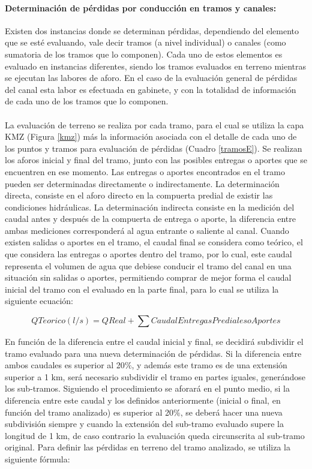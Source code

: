 \documentclass[]{article}
\begin{document}
\paragraph{Determinación de pérdidas por conducción en tramos y canales:} Existen dos instancias donde se determinan pérdidas, dependiendo del elemento que se esté evaluando, vale decir tramos (a nivel individual) o canales (como sumatoria de los tramos que lo componen). Cada uno de estos elementos es evaluado en instancias diferentes, siendo los tramos evaluados en terreno mientras se ejecutan las labores de aforo. En el caso de la evaluación general de pérdidas del canal esta labor es efectuada en gabinete, y con la totalidad de información de cada uno de los tramos que lo componen.\\
\\
La evaluación de terreno se realiza por cada tramo, para el cual se utiliza la capa KMZ (Figura \ref{kmz}) más la información asociada con el detalle de cada uno de los puntos y tramos para evaluación de pérdidas (Cuadro \ref{tramosE}). Se realizan los aforos inicial y final del tramo, junto con las posibles entregas o aportes que se encuentren en ese momento. Las entregas o aportes encontrados en el tramo pueden ser determinadas directamente o indirectamente. La determinación directa, consiste en el aforo directo en la compuerta predial de existir las condiciones hidráulicas. La determinación indirecta consiste en la medición del caudal antes y después de la compuerta de entrega o aporte, la diferencia entre ambas mediciones corresponderá al agua entrante o saliente al canal. Cuando existen salidas o aportes en el tramo, el caudal final se considera como teórico, el que considera las entregas o aportes dentro del tramo, por lo cual, este caudal representa el volumen de agua que debiese conducir el tramo del canal en una situación sin salidas o aportes, permitiendo comprar de mejor forma el caudal inicial del tramo con el evaluado en la parte final, para lo cual se utiliza la siguiente ecuación:

\begin{equation}
Q Teorico (l/s) = Q Real + \sum{Caudal Entregas Prediales o Aportes}
\end{equation}

En función de la diferencia entre el caudal inicial y final, se decidirá subdividir el tramo evaluado para una nueva determinación de pérdidas.  Si la diferencia entre ambos caudales es superior al 20$\%$, y además este tramo es de una extensión superior a 1 km, será necesario subdividir el tramo en partes iguales, generándose los sub-tramos. Siguiendo el procedimiento se aforará en el punto medio, si la diferencia entre este caudal y los definidos  anteriormente (inicial o final, en función del tramo analizado) es superior al 20$\%$, se deberá hacer una nueva subdivisión siempre y cuando la extensión del sub-tramo evaluado supere la longitud de 1 km, de caso contrario la evaluación queda circunscrita al sub-tramo original. Para definir las pérdidas en terreno del tramo analizado, se utiliza la siguiente fórmula:
\end{document}
